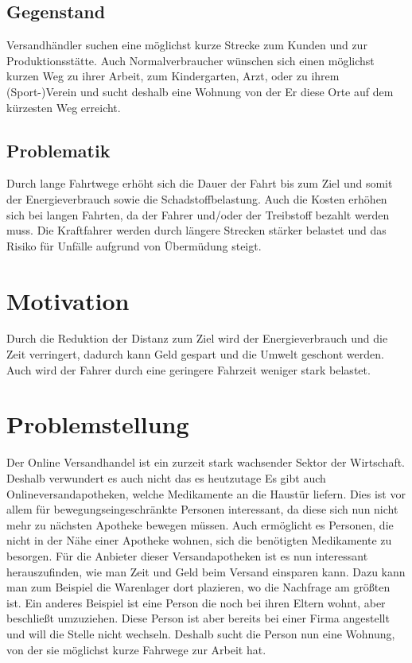\documentclass[a4paper, 12pt]{scrreprt}
\begin{document}
\subsection{Gegenstand}
Versandhändler suchen eine möglichst kurze Strecke zum Kunden und zur Produktionsstätte.
Auch Normalverbraucher wünschen sich einen möglichst kurzen Weg zu ihrer Arbeit, zum Kindergarten, Arzt, oder zu ihrem (Sport-)Verein und sucht deshalb eine Wohnung von der Er diese Orte auf dem kürzesten Weg erreicht.
\subsection{Problematik}
Durch lange Fahrtwege erhöht sich die Dauer der Fahrt bis zum Ziel und somit der Energieverbrauch sowie die Schadstoffbelastung.
Auch die Kosten erhöhen sich bei langen Fahrten, da der Fahrer und/oder der Treibstoff bezahlt werden muss.
Die Kraftfahrer werden durch längere Strecken stärker belastet und das Risiko für Unfälle aufgrund von Übermüdung steigt.\cite{hoffmann1966belastung}
\section{Motivation}
Durch die Reduktion der Distanz zum Ziel wird der Energieverbrauch und die Zeit verringert, dadurch kann Geld gespart und die Umwelt geschont werden.
Auch wird der Fahrer durch eine geringere Fahrzeit weniger stark belastet.
\section{Problemstellung}
Der Online Versandhandel ist ein zurzeit stark wachsender Sektor der Wirtschaft.\cite{Stepper2016}
Deshalb verwundert es auch nicht das es heutzutage
Es gibt auch Onlineversandapotheken, welche Medikamente an die Haustür liefern.
Dies ist vor allem für bewegungseingeschränkte Personen interessant, da diese sich nun nicht mehr zu nächsten Apotheke bewegen müssen.
Auch ermöglicht es Personen, die nicht in der Nähe einer Apotheke wohnen, sich die benötigten Medikamente zu besorgen.
Für die Anbieter dieser Versandapotheken ist es nun interessant herauszufinden, wie man Zeit und Geld beim Versand einsparen kann.
Dazu kann man zum Beispiel die Warenlager dort plazieren, wo die Nachfrage am größten ist.
Ein anderes Beispiel ist eine Person die noch bei ihren Eltern wohnt, aber beschließt umzuziehen.
Diese Person ist aber bereits bei einer Firma angestellt und will die Stelle nicht wechseln.
Deshalb sucht die Person nun eine Wohnung, von der sie möglichst kurze Fahrwege zur Arbeit hat.
\end{document}
